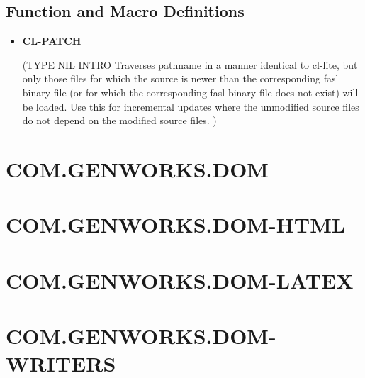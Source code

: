 \documentclass [11pt]{book}
\begin{document}
\subsection{Function and Macro Definitions}

\label{subsec:functionandmacrodefinitions}



\begin{itemize}

\item {}
\label{prim:cl-patch}
\textbf{CL-PATCH}

(TYPE NIL INTRO 
Traverses pathname in a manner identical to cl-lite, but only those
files for which the source is newer than the corresponding fasl
binary file (or for which the corresponding fasl binary file does
not exist) will be loaded. Use this for incremental updates where
the unmodified source files do not depend on the modified source
files.
)



\end{itemize}





\section{COM.GENWORKS.DOM }

\label{sec:com.genworks.dom}







\section{COM.GENWORKS.DOM-HTML }

\label{sec:com.genworks.dom-html}







\section{COM.GENWORKS.DOM-LATEX }

\label{sec:com.genworks.dom-latex}







\section{COM.GENWORKS.DOM-WRITERS }
\end{document}
